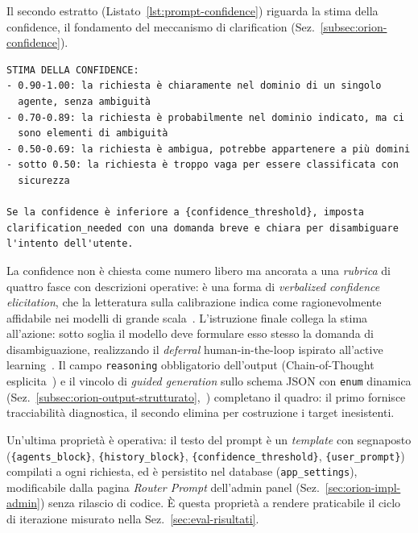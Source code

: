Il secondo estratto (Listato~\ref{lst:prompt-confidence}) riguarda la stima
della confidence, il fondamento del meccanismo di clarification
(Sez.~\ref{subsec:orion-confidence}).

\begin{lstlisting}[caption={Estratto del system prompt del router (v1.0): rubrica di confidence e istruzione di deferral.},label={lst:prompt-confidence}]
STIMA DELLA CONFIDENCE:
- 0.90-1.00: la richiesta è chiaramente nel dominio di un singolo
  agente, senza ambiguità
- 0.70-0.89: la richiesta è probabilmente nel dominio indicato, ma ci
  sono elementi di ambiguità
- 0.50-0.69: la richiesta è ambigua, potrebbe appartenere a più domini
- sotto 0.50: la richiesta è troppo vaga per essere classificata con
  sicurezza

Se la confidence è inferiore a {confidence_threshold}, imposta
clarification_needed con una domanda breve e chiara per disambiguare
l'intento dell'utente.
\end{lstlisting}

La confidence non è chiesta come numero libero ma ancorata a una
\emph{rubrica} di quattro fasce con descrizioni operative: è una forma di
\emph{verbalized confidence elicitation}, che la letteratura sulla
calibrazione indica come ragionevolmente affidabile nei modelli di grande
scala~\cite{kadavath2022knowsknows}. L'istruzione finale collega la stima
all'azione: sotto soglia il modello deve formulare esso stesso la domanda di
disambiguazione, realizzando il \emph{deferral} human-in-the-loop ispirato
all'active learning~\cite{settles2012active,diao2023activeprompting}.
Il campo \texttt{reasoning} obbligatorio dell'output (Chain-of-Thought
esplicita~\cite{wei2022cot}) e il vincolo di \emph{guided
generation} sullo schema JSON con \texttt{enum} dinamica
(Sez.~\ref{subsec:orion-output-strutturato},~\cite{willard2023outlines})
completano il quadro: il primo fornisce tracciabilità diagnostica, il
secondo elimina per costruzione i target inesistenti.

Un'ultima proprietà è operativa: il testo del prompt è un \emph{template}
con segnaposto (\texttt{\{agents\_block\}}, \texttt{\{history\_block\}},
\texttt{\{confidence\_threshold\}}, \texttt{\{user\_prompt\}}) compilati a
ogni richiesta, ed è persistito nel database (\texttt{app\_settings}),
modificabile dalla pagina \emph{Router Prompt} dell'admin panel
(Sez.~\ref{sec:orion-impl-admin}) senza rilascio di codice. È questa
proprietà a rendere praticabile il ciclo di iterazione misurato nella
Sez.~\ref{sec:eval-risultati}.

